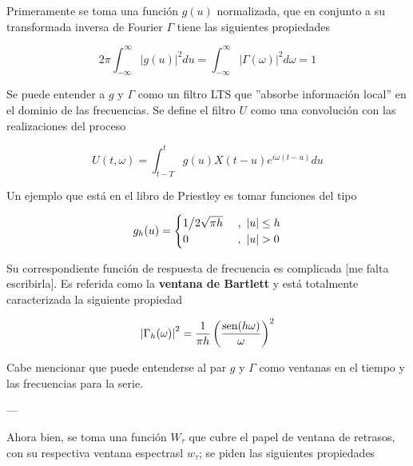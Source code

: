 Primeramente se toma una funci\'on $g(u)$ normalizada, que en conjunto a su
transformada inversa de Fourier
$\Gamma$ tiene las siguientes propiedades

\begin{equation*}
2\pi \int_{-\infty}^{\infty} \lvert g(u) \lvert^{2} du 
= 
\int_{-\infty}^{\infty} \lvert \Gamma(\omega) \lvert^{2} d\omega
= 1
\end{equation*}

Se puede entender a $g$ y $\Gamma$ como un filtro LTS que ''absorbe informaci\'on local''
en el dominio de las frecuencias.
Se define el filtro $U$ como una convoluci\'on
con las realizaciones del proceso

\begin{equation*}
U(t,\omega) = \int_{t-T}^{t} g(u) X({t-u}) e^{i \omega (t-u)} du
\end{equation*}

Un ejemplo que est\'a en el libro de Priestley es tomar funciones del tipo

\begin{equation*}
g_h(u) = 
\begin{cases}
{1 \big{/} 2\sqrt{\pi h}} & \text{ , } \left| u \right| \leq h
\\
0 & \text{ , } \left| u \right| > 0
\end{cases}
\end{equation*}

Su correspondiente funci\'on de respuesta de frecuencia es complicada [me falta 
escribirla]. Es referida como la \textbf{ventana de Bartlett} y
est\'a totalmente caracterizada la siguiente propiedad

\begin{equation*}
\left| \Gamma_h(\omega) \right|^{2} = \frac{1}{\pi h} \left( \frac{\text{sen} (h \omega)}{\omega} \right)^{2}
\end{equation*}

Cabe mencionar que puede entenderse al par $g$ y $\Gamma$ como ventanas en el tiempo
y las frecuencias para la serie.

---

Ahora bien, se toma una funci\'on $W_\tau$ que cubre el papel de ventana de retrasos,
con su respectiva ventana espectrasl $w_\tau$; se piden las siguientes propiedades

